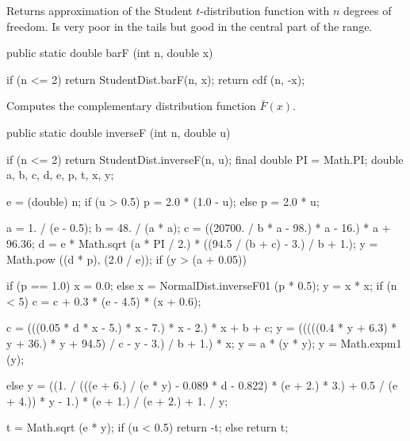 \begin{code}
\begin{hide}
{         y *= 2.0*Math.sqrt (n*b);
         z = y/n;
         k = 2;
         z2 = prec = 10.0;
         while (k < STUDENT_KMAX && prec > STUDENT_EPS) {
            y *= (k - 1)/(k*b);
            z += y/(n + k);
            prec = Math.abs (z - z2);
            z2 = z;
            k += 2;
         }
         if (k >= STUDENT_KMAX)
           System.err.println ("student: k >= STUDENT_KMAX");
         if (x >= 0.0)
            return 1.0 - z/2.0;
         else
            return z/2.0;
      }
   }\end{hide}
\end{code}
  \begin{tabb}
  Returns  approximation
  of the Student $t$-distribution function with $n$ degrees of freedom.
  Is very poor in the tails but good in the central part of the range.
  \end{tabb}
\begin{code}

   public static double barF (int n, double x)\begin{hide} {
        if (n <= 2)
           return StudentDist.barF(n, x);
      return cdf (n, -x);
   }\end{hide}
\end{code}
\begin{tabb} Computes the complementary distribution function $\bar{F}(x)$.
\end{tabb}
\begin{code}

   public static double inverseF (int n, double u)\begin{hide} {
        if (n <= 2)
           return StudentDist.inverseF(n, u);
      final double PI = Math.PI;
      double a, b, c, d, e, p, t, x, y;

      e = (double) n;
      if (u > 0.5)
         p = 2.0 * (1.0 - u);
      else
         p = 2.0 * u;

      a = 1. / (e - 0.5);
      b = 48. / (a * a);
      c = ((20700. / b * a - 98.) * a - 16.) * a + 96.36;
      d = e * Math.sqrt (a * PI / 2.) * ((94.5 / (b + c) - 3.) / b + 1.);
      y = Math.pow ((d * p), (2.0 / e));
      if (y > (a + 0.05)) {
         if (p == 1.0)
            x = 0.0;
         else
            x = NormalDist.inverseF01 (p * 0.5);
         y = x * x;
         if (n < 5)
            c = c + 0.3 * (e - 4.5) * (x + 0.6);

         c = (((0.05 * d * x - 5.) * x - 7.) * x - 2.) * x + b + c;
         y = (((((0.4 * y + 6.3) * y + 36.) * y + 94.5) /
               c - y - 3.) / b + 1.) * x;
         y = a * (y * y);
         y = Math.expm1 (y);

      } else {
         y = ((1. / (((e + 6.) / (e * y) - 0.089 * d - 0.822) *
                     (e + 2.) * 3.) + 0.5 / (e + 4.)) * y - 1.) *
               (e + 1.) / (e + 2.) + 1. / y;
      }

      t = Math.sqrt (e * y);
      if (u < 0.5)
         return -t;
      else
         return t;
    }\end{hide}
\end{code}
